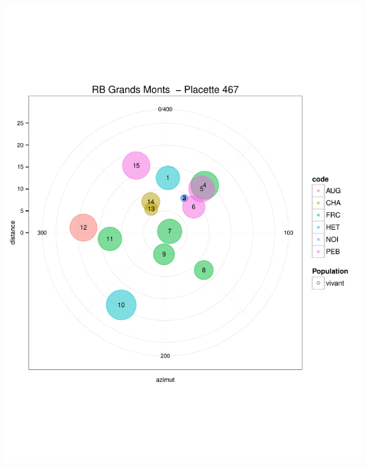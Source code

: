 \documentclass[a4paper]{book}\usepackage[]{graphicx}\usepackage[]{color}
\makeatletter
\def\maxwidth{ %
  \ifdim\Gin@nat@width>\linewidth
    \linewidth
  \else
    \Gin@nat@width
  \fi
}
\newenvironment{knitrout}{}{} %
\makeatother
\begin{document}
\begin{knitrout}
{\centering \includegraphics[width=\maxwidth]{Figures/PlanArbres-52} 

}





\end{knitrout}
\end{document}
